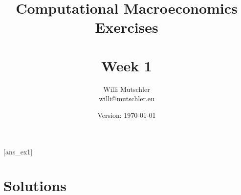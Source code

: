 
\newif\ifDisplaySolutions \DisplaySolutionstrue


\title{Computational Macroeconomics\\Exercises\\~\\Week 1}
\author{Willi Mutschler\\willi@mutschler.eu}
\date{Version: \today}
\maketitle\thispagestyle{empty}

\newpage
{}[ans_ex1]
\tableofcontents\thispagestyle{empty}\newpage

\setcounter{page}{1}
\newpage
\newpage
\newpage
\newpage
\newpage

\printbibliography
{}
\ifDisplaySolutions
\newpage
\appendix
\section{Solutions}

\fi
